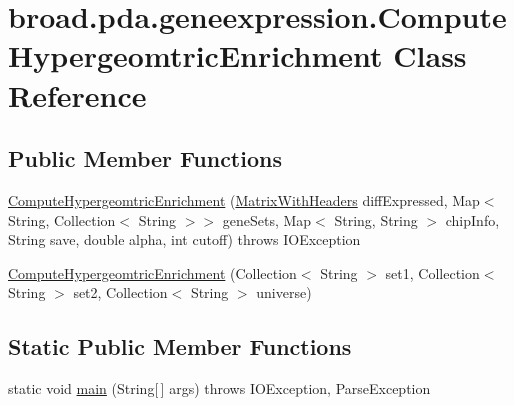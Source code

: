 \hypertarget{classbroad_1_1pda_1_1geneexpression_1_1_compute_hypergeomtric_enrichment}{\section{broad.\+pda.\+geneexpression.\+Compute\+Hypergeomtric\+Enrichment Class Reference}
\label{classbroad_1_1pda_1_1geneexpression_1_1_compute_hypergeomtric_enrichment}
}
\subsection*{Public Member Functions}
\begin{DoxyCompactItemize}
\item 
\hyperlink{classbroad_1_1pda_1_1geneexpression_1_1_compute_hypergeomtric_enrichment_a9ea7926db744a08de985d2248c1cb072}{Compute\+Hypergeomtric\+Enrichment} (\hyperlink{classbroad_1_1core_1_1datastructures_1_1_matrix_with_headers}{Matrix\+With\+Headers} diff\+Expressed, Map$<$ String, Collection$<$ String $>$$>$ gene\+Sets, Map$<$ String, String $>$ chip\+Info, String save, double alpha, int cutoff)  throws I\+O\+Exception
\item 
\hyperlink{classbroad_1_1pda_1_1geneexpression_1_1_compute_hypergeomtric_enrichment_ae3ce64be90e1a4c3e0f0cc5c764aa18b}{Compute\+Hypergeomtric\+Enrichment} (Collection$<$ String $>$ set1, Collection$<$ String $>$ set2, Collection$<$ String $>$ universe)
\end{DoxyCompactItemize}
\subsection*{Static Public Member Functions}
\begin{DoxyCompactItemize}
\item 
static void \hyperlink{classbroad_1_1pda_1_1geneexpression_1_1_compute_hypergeomtric_enrichment_a8ce5ecf302efdf1804f8a34110b041bd}{main} (String\mbox{[}$\,$\mbox{]} args)  throws I\+O\+Exception, Parse\+Exception
\end{DoxyCompactItemize}


